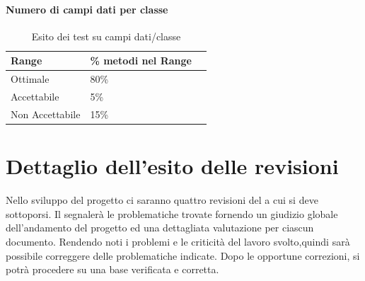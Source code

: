 \documentclass[12pt,a4paper]{article}
\begin{document}
\paragraph{Numero di campi dati per classe}
\begin{table}[H]
	\begin{center}
		\begin{tabular}{p{} p{} p{}}
			\toprule
			\textbf{Range}   & \textbf{\% metodi nel Range}	 \\ \midrule
			\midrule
			Ottimale & 80\% \\ \midrule
			Accettabile & 5\%  \\ \midrule
			Non Accettabile  & 15\%  \\ \midrule
			\bottomrule
		\end{tabular}
	\end{center}
	\caption{Esito dei test su campi dati/classe}
\end{table}

\section{Dettaglio dell'esito delle revisioni}
Nello sviluppo del progetto ci saranno quattro revisioni del  a cui si deve sottoporsi. Il  segnalerà le problematiche trovate fornendo un giudizio globale dell'andamento del progetto ed una dettagliata valutazione per ciascun documento. Rendendo noti i problemi e le criticità del lavoro svolto,quindi sarà possibile correggere delle problematiche indicate. Dopo le opportune correzioni, si potrà procedere su una base verificata e corretta.
\end{document}
